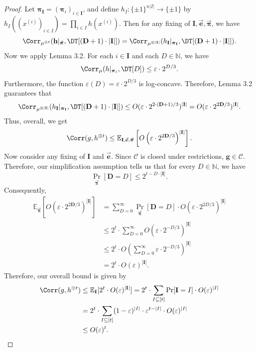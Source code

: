 \begin{proof}
Let $\boldsymbol\pi_{\mathbf I}=(\boldsymbol\pi_i)_{i\in\mathbf I}$, and define $h_I:\{\pm1\}^{n|I|}\to\{\pm1\}$ by $h_I((x^{(i)})_{i\in I})=\prod_{i\in I}h(x^{(i)})$. Then for any fixing of $\mathbf I,\vec{\mathbf e},\vec{\boldsymbol\pi}$, we have
\[\Corr_{\mu^{\otimes t}}(\mathbf h|_{\vec{\boldsymbol\pi}},\DT[(\mathbf D+1)\cdot|\mathbf I|])=\Corr_{\mu^{\otimes|\mathbf I|}}(h_{\mathbf I}|_{\boldsymbol\pi_{\mathbf I}},\DT[(\mathbf D+1)\cdot|\mathbf I|]).\]
Now we apply Lemma 3.2. For each $i\in\mathbf I$ and each $D\in\mathbb N$, we have
\[\Corr_\mu(h|_{\boldsymbol\pi_i},\DT[D])\le\varepsilon\cdot2^{D/3}.\]
Furthermore, the function $\varepsilon(D)=\varepsilon\cdot2^{D/3}$ is log-concave. Therefore, Lemma 3.2 guarantees that
\[\Corr_{\mu^{\otimes|\mathbf I|}}(h_{\mathbf I}|_{\boldsymbol\pi_{\mathbf I}},\DT[(\mathbf D+1)\cdot|\mathbf I|])\le O(\varepsilon\cdot2^{2\cdot(\mathbf D+1)/3})^{|\mathbf I|}=O(\varepsilon\cdot2^{2\mathbf D/3})^{|\mathbf I|}.\]
Thus, overall, we get
\[\Corr(g,h^{\oplus t})\le\mathbb E_{\mathbf I,\vec{\mathbf e},\vec{\boldsymbol\pi}}\left[O\left(\varepsilon\cdot2^{2\mathbf D/3}\right)^{|\mathbf I|}\right].\]
Now consider any fixing of $\mathbf I$ and $\vec{\mathbf e}$. Since $\mathcal C$ is closed under restrictions, $\mathbf g\in\mathcal C$. Therefore, our simplification assumption tells us that for every $D\in\mathbb N$, we have
\[\Pr_{\vec{\boldsymbol\pi}}[\mathbf D=D]\le2^{t-D\cdot|\mathbf I|}.\]
Consequently,
\begin{align*}
\mathbb E_{\vec{\boldsymbol\pi}}\left[O\left(\varepsilon\cdot2^{2\mathbf D/3}\right)^{|\mathbf I|}\right]&=\sum_{D=0}^\infty\Pr_{\vec{\boldsymbol\pi}}[\mathbf D=D]\cdot O\left(\varepsilon\cdot2^{2D/3}\right)^{|\mathbf I|}\\
&\le2^t\cdot\sum_{D=0}^\infty O\left(\varepsilon\cdot2^{-D/3}\right)^{|\mathbf I|}\\
&\le2^t\cdot O\left(\sum_{D=0}^\infty\varepsilon\cdot2^{-D/3}\right)^{|\mathbf I|}\\
&=2^t\cdot O(\varepsilon)^{|\mathbf I|}.
\end{align*}
Therefore, our overall bound is given by
\begin{align*}
\Corr(g,h^{\oplus t})&\le\mathbb E_{\mathbf I}[2^t\cdot O(\varepsilon)^{|\mathbf I|}]=2^t\cdot\sum_{I\subseteq[t]}\Pr[\mathbf I=I]\cdot O(\varepsilon)^{|I|}\\
&=2^t\cdot\sum_{I\subseteq[t]}(1-\varepsilon)^{|I|}\cdot\varepsilon^{t-|I|}\cdot O(\varepsilon)^{|I|}\\
&\le O(\varepsilon)^t.
\end{align*}
\end{proof}
